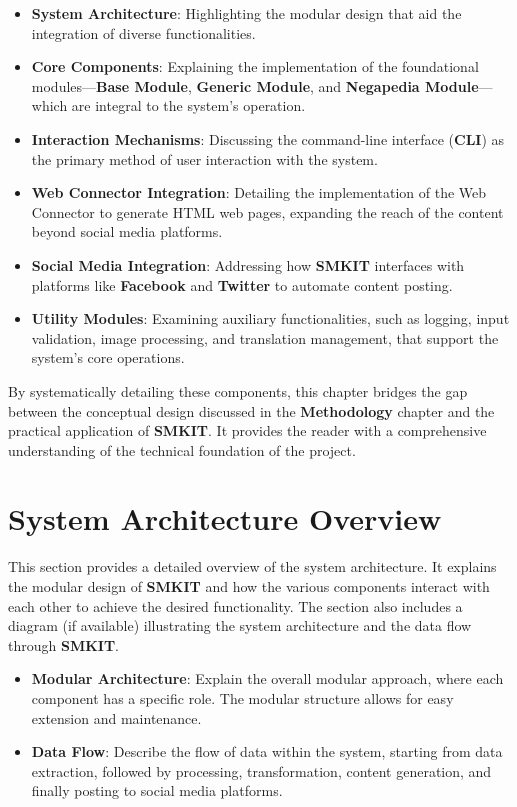 \begin{itemize}
    \item \textbf{System Architecture}: Highlighting the modular design that aid the integration of diverse functionalities.
    \item \textbf{Core Components}: Explaining the implementation of the foundational modules—\textbf{Base Module}, \textbf{Generic Module}, and \textbf{Negapedia Module}—which are integral to the system's operation.
    \item \textbf{Interaction Mechanisms}: Discussing the command-line interface (\textbf{CLI}) as the primary method of user interaction with the system.
    \item \textbf{Web Connector Integration}: Detailing the implementation of the Web Connector to generate HTML web pages, expanding the reach of the content beyond social media platforms.
    \item \textbf{Social Media Integration}: Addressing how \textbf{SMKIT} interfaces with platforms like \textbf{Facebook} and \textbf{Twitter} to automate content posting.
    \item \textbf{Utility Modules}: Examining auxiliary functionalities, such as logging, input validation, image processing, and translation management, that support the system's core operations.
\end{itemize}

By systematically detailing these components, this chapter bridges the gap between the conceptual design discussed in the \textbf{Methodology} chapter and the practical application of \textbf{SMKIT}. It provides the reader with a comprehensive understanding of the technical foundation of the project.


\section{System Architecture Overview}
\label{sec:system_architecture_overview}
This section provides a detailed overview of the system architecture. It explains the modular design of \textbf{SMKIT} and how the various components interact with each other to achieve the desired functionality. The section also includes a diagram (if available) illustrating the system architecture and the data flow through \textbf{SMKIT}.

\begin{itemize}
    \item \textbf{Modular Architecture}: Explain the overall modular approach, where each component has a specific role. The modular structure allows for easy extension and maintenance.
    \item \textbf{Data Flow}: Describe the flow of data within the system, starting from data extraction, followed by processing, transformation, content generation, and finally posting to social media platforms.
\end{itemize}

